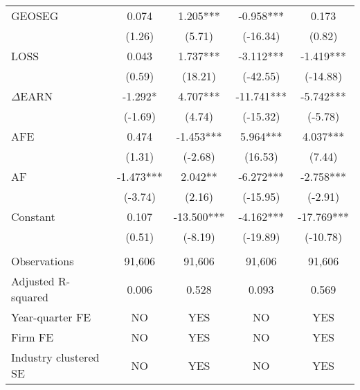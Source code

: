 \begin{table}[htbp]
\begin{tabular}{lcccc}
    GEOSEG & 0.074 & 1.205*** & -0.958*** & 0.173 \\
      & (1.26) & (5.71) & (-16.34) & (0.82) \\
    LOSS & 0.043 & 1.737*** & -3.112*** & -1.419*** \\
      & (0.59) & (18.21) & (-42.55) & (-14.88) \\
    $\Delta$EARN & -1.292* & 4.707*** & -11.741*** & -5.742*** \\
      & (-1.69) & (4.74) & (-15.32) & (-5.78) \\
    AFE & 0.474 & -1.453*** & 5.964*** & 4.037*** \\
      & (1.31) & (-2.68) & (16.53) & (7.44) \\
    AF & -1.473*** & 2.042** & -6.272*** & -2.758*** \\
      & (-3.74) & (2.16) & (-15.95) & (-2.91) \\
    Constant & 0.107 & -13.500*** & -4.162*** & -17.769*** \\
      & (0.51) & (-8.19) & (-19.89) & (-10.78) \\
      &   &   &   &  \\
    Observations & 91,606 & 91,606 & 91,606 & 91,606 \\
    Adjusted R-squared & 0.006 & 0.528 & 0.093 & 0.569 \\
    Year-quarter FE & NO & YES & NO & YES \\
    Firm FE & NO & YES & NO & YES \\
    Industry clustered SE & NO & YES & NO & YES \\
    \bottomrule
    \end{tabular}%
\end{table}%
